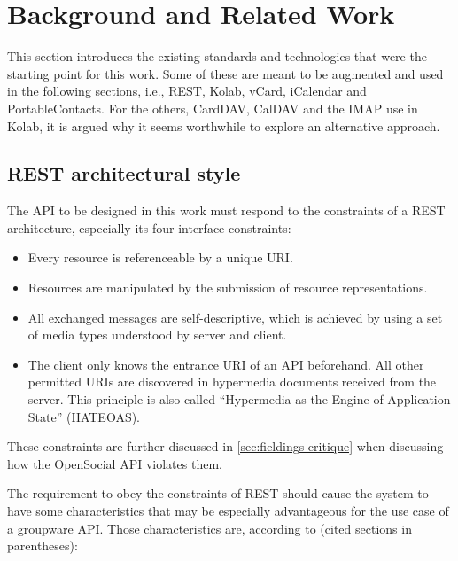 \documentclass[11pt,a4paper,headsepline,twoside]{scrartcl}		%
\begin{document}
\section{Background and Related Work}
\label{sec:backgr-relat-work}

This section introduces the existing standards and technologies that were the
starting point for this work. Some of these are meant to be augmented and used
in the following sections, i.e., REST, Kolab, vCard, iCalendar and
PortableContacts. For the others, CardDAV, CalDAV and the IMAP use in Kolab, it
is argued why it seems worthwhile to explore an alternative approach.

\subsection{REST architectural style}

The API to be designed in this work must respond to the constraints of a REST
architecture, especially its four interface
constraints\cite[sec. 5.1.5]{Fielding2000}:

\begin{itemize}
\item Every resource is referenceable by a unique URI.
\item Resources are manipulated by the submission of resource representations.
\item All exchanged messages are self-descriptive, which is achieved by using a
  set of media types understood by server and client.
\item The client only knows the entrance URI of an API beforehand. All other
  permitted URIs are discovered in hypermedia documents received from the
  server. This principle is also called ``Hypermedia as the Engine of
  Application State'' (HATEOAS).
\end{itemize}

These constraints are further discussed in \autoref{sec:fieldings-critique} when
discussing how the OpenSocial API violates them.

The requirement to obey the constraints of REST should cause the system to have
some characteristics that may be especially advantageous for the use case of a
groupware API. Those characteristics are, according to \cite{Fielding2000}
(cited sections in parentheses):
\end{document}
